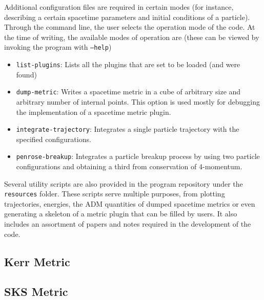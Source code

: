 Additional configuration files are required in certain modes (for instance, describing a certain spacetime parameters and initial conditions of a particle). Through the command line, the user selects the operation mode of the code. At the time of writing, the available modes of operation are (these can be viewed by invoking the program with \texttt{--help})
%
\begin{itemize}
  \item \texttt{list-plugins}: Lists all the plugins that are set to be loaded (and were found)
  \item \texttt{dump-metric}: Writes a spacetime metric in a cube of arbitrary size and arbitrary number of internal points. This option is used mostly for debugging the implementation of a spacetime metric plugin.
  \item \texttt{integrate-trajectory}: Integrates a single particle trajectory with the specified configurations.
  \item \texttt{penrose-breakup}: Integrates a particle breakup process by using two particle configurations and obtaining a third from conservation of 4-momentum.
\end{itemize}
%
Several utility scripts are also provided in the program repository under the \texttt{resources} folder. These scripts serve multiple purposes, from plotting trajectories, energies, the \ac{ADM} quantities of dumped spacetime metrics or even generating a skeleton of a metric plugin that can be filled by users. It also includes an assortment of papers and notes required in the development of the code.

\subsection{Kerr Metric}
\label{ch:kerr_example}


\subsection{\ac{SKS} Metric}
